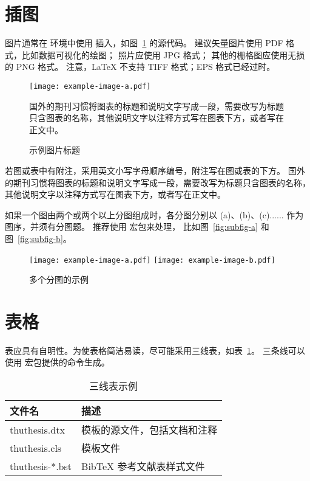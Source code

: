\section{插图}

图片通常在  环境中使用  插入，如图~\ref{fig:example} 的源代码。
建议矢量图片使用 PDF 格式，比如数据可视化的绘图；
照片应使用 JPG 格式；
其他的栅格图应使用无损的 PNG 格式。
注意，LaTeX 不支持 TIFF 格式；EPS 格式已经过时。

\begin{figure}
  \centering
  \texttt{[image: example-image-a.pdf]}
  \caption*{国外的期刊习惯将图表的标题和说明文字写成一段，需要改写为标题只含图表的名称，其他说明文字以注释方式写在图表下方，或者写在正文中。}
  \caption{示例图片标题}
  \label{fig:example}
\end{figure}

若图或表中有附注，采用英文小写字母顺序编号，附注写在图或表的下方。
国外的期刊习惯将图表的标题和说明文字写成一段，需要改写为标题只含图表的名称，其他说明文字以注释方式写在图表下方，或者写在正文中。

如果一个图由两个或两个以上分图组成时，各分图分别以 (a)、(b)、(c)...... 作为图序，并须有分图题。
推荐使用  宏包来处理， 比如图~\ref{fig:subfig-a} 和图~\ref{fig:subfig-b}。

\begin{figure}
  \centering
    {\texttt{[image: example-image-a.pdf]}}
    {\texttt{[image: example-image-b.pdf]}}
  \caption{多个分图的示例}
  \label{fig:multi-image}
\end{figure}



\section{表格}

表应具有自明性。为使表格简洁易读，尽可能采用三线表，如表~\ref{tab:three-line}。
三条线可以使用  宏包提供的命令生成。

\begin{table}
  \centering
  \caption{三线表示例}
  \begin{tabular}{ll}
    \toprule
    文件名          & 描述                         \\
    \midrule
    thuthesis.dtx   & 模板的源文件，包括文档和注释 \\
    thuthesis.cls   & 模板文件                     \\
    thuthesis-*.bst & BibTeX 参考文献表样式文件    \\
    \bottomrule
  \end{tabular}
  \label{tab:three-line}
\end{table}

